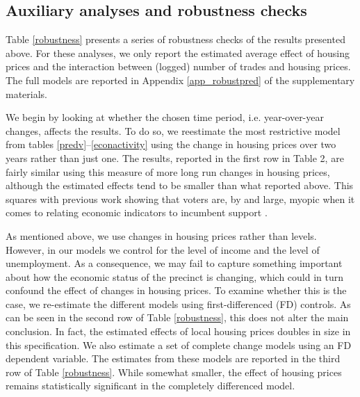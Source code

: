 \documentclass[12pt,a4paper]{article}
\begin{document}
	\subsection{Auxiliary analyses and robustness checks}
	Table \ref{robustness} presents a series of robustness checks of the results presented above. For these analyses, we only report the estimated average effect of housing prices and the interaction between (logged) number of trades and housing prices. The full models are reported in Appendix \ref{app_robustpred} of the supplementary materials.
	
	
	
	We begin by looking at whether the chosen time period, i.e. year-over-year changes, affects the results. To do so, we reestimate the most restrictive model from tables \ref{predv}--\ref{econactivity} using the change in housing prices over two years rather than just one. The results, reported in the first row in Table 2, are fairly similar using this measure of more long run changes in housing prices, although the estimated effects tend to be smaller than what reported above. This squares with previous work showing that voters are, by and large, myopic when it comes to relating economic indicators to incumbent support \citep{healy2009myopic,healy2014substituting}.
	
	As mentioned above, we use changes in housing prices rather than levels. However, in our models we control for the level of income and the level of unemployment. As a consequence,  we may fail to capture something important about how the economic status of the precinct is changing, which could in turn confound the effect of changes in housing prices. To examine whether this is the case, we re-estimate the different models using first-differenced (FD) controls. As can be seen in the second row of Table \ref{robustness}, this does not alter the main conclusion. In fact, the estimated effects of local housing prices doubles in size in this specification. We also estimate a set of complete change models using an FD dependent variable. The estimates from these models are reported in the third row of Table \ref{robustness}. While somewhat smaller, the effect of housing prices remains statistically significant in the completely differenced model.
	
\end{document}
